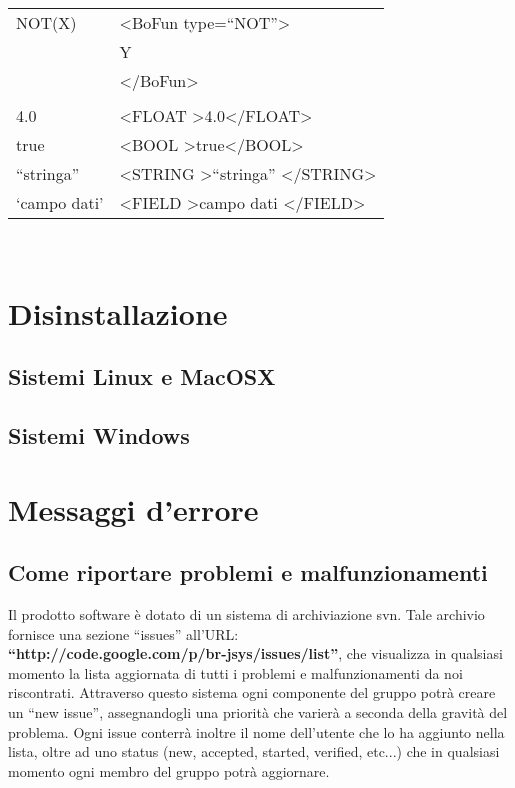 \begin{table}[htbp]
\begin{tabular}{||p{3cm}||p{6.5cm}||}
\hline
NOT(X) & \textless BoFun type=``NOT''\textgreater \\
&  Y \\
& \textless /BoFun\textgreater \\ \hline
& \\ \hline 
4.0 & \textless FLOAT \textgreater4.0\textless /FLOAT\textgreater \\ \hline
true & \textless BOOL \textgreater true\textless /BOOL\textgreater \\ \hline
``stringa'' & \textless STRING \textgreater ``stringa'' \textless /STRING\textgreater \\ \hline
`campo dati' &\textless FIELD \textgreater campo dati \textless /FIELD\textgreater \\ \hline
\end{tabular} \\
\end{table}

\chapter{Disinstallazione}
\section{Sistemi Linux e MacOSX}
\section{Sistemi Windows}


\chapter{Messaggi d'errore}
\section{Come riportare problemi e malfunzionamenti}
Il prodotto software \`e dotato di un sistema di archiviazione svn. Tale archivio fornisce una sezione ``issues'' all'URL: \\ 
\textbf{``http://code.google.com/p/br-jsys/issues/list''}, che visualizza in qualsiasi momento la lista aggiornata di tutti i problemi e malfunzionamenti da noi riscontrati. Attraverso questo sistema ogni componente del gruppo potr\`a creare un ``new issue'', assegnandogli una priorit\`a che varier\`a a seconda della gravit\`a del problema. Ogni issue conterr\`a inoltre il nome dell'utente che lo ha aggiunto nella lista, oltre ad uno status (new, accepted, started, verified, etc...) che in qualsiasi momento ogni membro del gruppo potr\`a aggiornare. 


